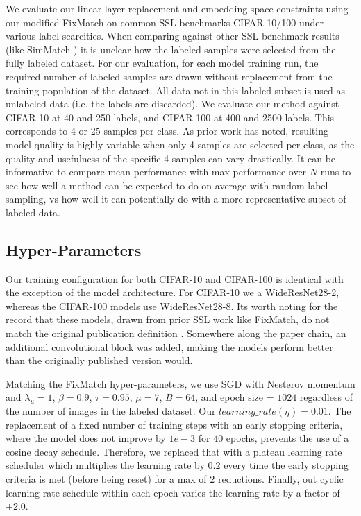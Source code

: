 \documentclass[10pt,twocolumn,letterpaper]{article}
\begin{document}
We evaluate our linear layer replacement and embedding space constraints using our modified FixMatch on common SSL benchmarks CIFAR-10/100 \cite{cifar10} under various label scarcities. 
When comparing against other SSL benchmark results (like SimMatch \cite{zheng2022simmatch}) it is unclear how the labeled samples were selected from the fully labeled dataset. 
For our evaluation, for each model training run, the required number of labeled samples are drawn without replacement from the training population of the dataset.
All data not in this labeled subset is used as unlabeled data (i.e. the labels are discarded).
We evaluate our method against CIFAR-10 at 40 and 250 labels, and CIFAR-100 at 400 and 2500 labels. 
This corresponds to 4 or 25 samples per class.
As prior work \cite{sohn2020fixmatch} has noted, resulting model quality is highly variable when only 4 samples are selected per class, as the quality and usefulness of the specific 4 samples can vary drastically. 
It can be informative to compare mean performance with max performance over $N$ runs to see how well a method can be expected to do on average with random label sampling, vs how well it can potentially do with a more representative subset of labeled data.

\subsection{Hyper-Parameters}

Our training configuration for both CIFAR-10 and CIFAR-100 is identical with the exception of the model architecture.
For CIFAR-10 we a WideResNet28-2, whereas the CIFAR-100 models use WideResNet28-8.
Its worth noting for the record that these models, drawn from prior SSL work like FixMatch, do not match the original publication definition \cite{zagoruyko2016wide}.
Somewhere along the paper chain, an additional convolutional block was added, making the models perform better than the originally published version would.

Matching the FixMatch \cite{sohn2020fixmatch} hyper-parameters, we use SGD with Nesterov momentum and $\lambda_u = 1$, $\beta = 0.9$, $\tau = 0.95$, $\mu = 7$, $B = 64$, and epoch size = $1024$ regardless of the number of images in the labeled dataset.
Our $learning\_rate (\eta) = 0.01$.
The replacement of a fixed number of training steps with an early stopping criteria, where the model does not improve by $1e-3$ for $40$ epochs, prevents the use of a cosine decay schedule.
Therefore, we replaced that with a plateau learning rate scheduler which multiplies the learning rate by $0.2$ every time the early stopping criteria is met (before being reset) for a max of 2 reductions.
Finally, out cyclic learning rate schedule within each epoch varies the learning rate by a factor of $\pm2.0$.
\end{document}
